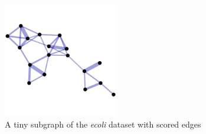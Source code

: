 \begin{figure}
\includegraphics[height=5cm]{graph_example_scored_edges.png}
\caption{A tiny subgraph of the \textsl{ecoli} dataset with scored edges}
\label{fig:graph_example_scored_edges}
\end{figure}
